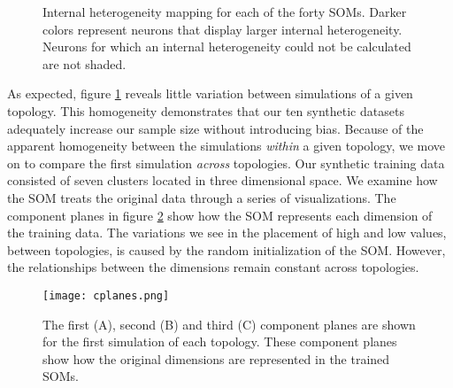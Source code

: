\begin{figure}[ht]
\centering
\begin{minipage}{\textwidth}

\hspace{0.11in} \begin{minipage}{6.22in}
\caption{Internal heterogeneity mapping for each of the forty SOMs. Darker colors
represent neurons that display larger internal heterogeneity. Neurons for which
an internal heterogeneity could not be calculated are not shaded.}
\label{ten}
\end{minipage}
\end{minipage}
\end{figure}

As expected, figure \ref{ten} reveals little variation 
between simulations of a given topology.  This homogeneity demonstrates that
our ten synthetic datasets adequately increase our sample size without introducing bias.  
Because of the apparent homogeneity between the simulations \emph{within} a
given topology, we move on to compare the first simulation \emph{across} topologies.  
Our synthetic training data consisted of seven clusters located in three
dimensional space. We examine how the SOM treats the original data through a
series of visualizations.  The component planes in figure \ref{cplanes} show
how the SOM represents each dimension of the training data.  The variations we
see in the placement of high and low values, between topologies, is caused by
the random initialization of the SOM.  However, the relationships between the
dimensions remain constant across topologies. 

\begin{figure}[ht]
\centering
\begin{minipage}{\textwidth}
\texttt{[image: cplanes.png]}
\caption{The first (A), second (B) and third (C) component planes are shown for the first simulation of each topology.  These component planes show how the original dimensions are represented in the trained SOMs.}
\label{cplanes}
\end{minipage}
\end{figure}



